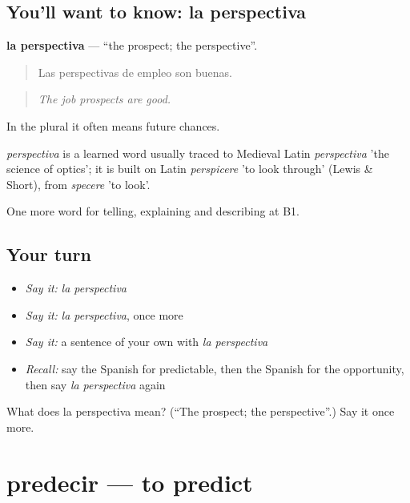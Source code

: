 \subsection*{You'll want to know: la perspectiva}
\textbf{la perspectiva} — \textquotedblleft{}the prospect; the perspective\textquotedblright{}.

\begin{quote}
Las perspectivas de empleo son buenas.
\end{quote}

\begin{quote}
\emph{The job prospects are good.}
\end{quote}

In the plural it often means future chances.

\begin{cousinweb}
\emph{perspectiva} is a learned word usually traced to Medieval Latin \emph{perspectiva} 'the science of optics'; it is built on Latin \emph{perspicere} 'to look through' (Lewis \& Short), from \emph{specere} 'to look'.
\end{cousinweb}

\begin{grammarlens}[title={What you've built}]
One more word for telling, explaining and describing at B1.
\end{grammarlens}

\subsection*{Your turn}
\begin{itemize}
\raggedright
  \item \emph{Say it:} \emph{la perspectiva}
  \item \emph{Say it:} \emph{la perspectiva}, once more
  \item \emph{Say it:} a sentence of your own with \emph{la perspectiva}
  \item \emph{Recall:} say the Spanish for predictable, then the Spanish for the opportunity, then say \emph{la perspectiva} again
\end{itemize}

\begin{tcolorbox}[breakable,colback=teal!4,colframe=teal!35!black,title={Before you move on}]
What does la perspectiva mean? (\textquotedblleft{}The prospect; the perspective\textquotedblright{}.) Say it once more.
\end{tcolorbox}
\section[predecir]{predecir — to predict}

